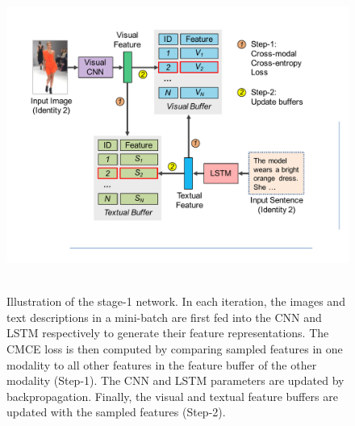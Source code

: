 \begin{figure}
\begin{center}
\includegraphics[width=0.9\linewidth]{figures/textual_visual_matching/stage1.pdf} \ \\
\end{center}
\caption{Illustration of the stage-1 network. In each iteration, the images and text descriptions in a mini-batch are first fed into the CNN and LSTM respectively to generate their feature representations. The CMCE loss is then computed by comparing sampled features in one modality to all other features in the feature buffer of the other modality (Step-1). The CNN and LSTM parameters are updated by backpropagation. Finally, the visual and textual feature buffers are updated with the sampled features (Step-2).}
\label{fig:stage1}
\end{figure}

